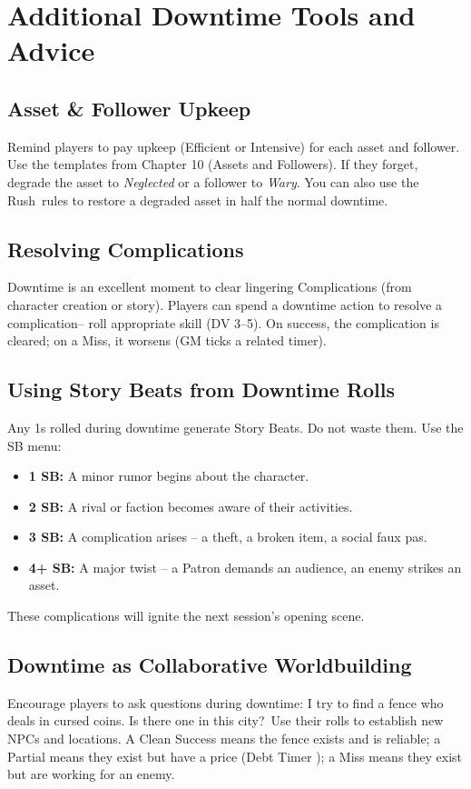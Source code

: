 \section{Additional Downtime Tools and Advice}
\label{sec:downtime-advice}

\subsection{Asset \& Follower Upkeep}
Remind players to pay upkeep (Efficient or Intensive) for each asset and follower. Use the templates from Chapter 10 (Assets and Followers). If they forget, degrade the asset to \textit{Neglected} or a follower to \textit{Wary}. You can also use the \textquotedbl Rush\textquotedbl\ rules to restore a degraded asset in half the normal downtime.

\subsection{Resolving Complications}
Downtime is an excellent moment to clear lingering Complications (from character creation or story). Players can spend a downtime action to \textquotedbl resolve a complication\textquotedbl -- roll appropriate skill (DV 3--5). On success, the complication is cleared; on a Miss, it worsens (GM ticks a related timer).

\subsection{Using Story Beats from Downtime Rolls}
Any 1s rolled during downtime generate Story Beats. Do not waste them. Use the SB menu:
\begin{itemize}
\item \textbf{1 SB:} A minor rumor begins about the character.
\item \textbf{2 SB:} A rival or faction becomes aware of their activities.
\item \textbf{3 SB:} A complication arises -- a theft, a broken item, a social faux pas.
\item \textbf{4+ SB:} A major twist -- a Patron demands an audience, an enemy strikes an asset.
\end{itemize}
These complications will ignite the next session's opening scene.

\subsection{Downtime as Collaborative Worldbuilding}
Encourage players to ask questions during downtime: \textquotedbl I try to find a fence who deals in cursed coins. Is there one in this city?\textquotedbl\ Use their rolls to establish new NPCs and locations. A Clean Success means the fence exists and is reliable; a Partial means they exist but have a price (Debt Timer ); a Miss means they exist but are working for an enemy.

